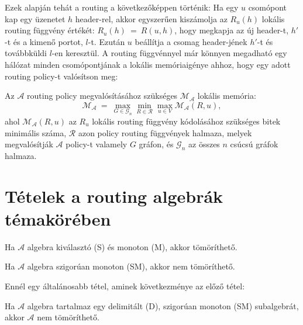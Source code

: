   Ezek alapján tehát a routing a következőképpen történik: Ha egy $u$ csomópont kap egy üzenetet $h$ header-rel, akkor egyszerűen kiszámolja az $R_{u}(h)$ lokális routing függvény értékét: $R_{u}(h)~=~R(u,h)$, hogy megkapja az új header-t, $h'$-t és a kimenő portot, $l$-t. Ezután $u$ beállítja a csomag header-jének $h'$-t és továbbküldi $l$-en keresztül.
  A routing függvénnyel már könnyen megadható egy hálózat minden csomópontjának a lokális memóriaigénye ahhoz, hogy egy adott routing policy-t valósítson meg:
  \begin{definition} 
    Az $\mathcal{A}$ routing policy megvalósításához szükséges $\mathcal{M_{\mathcal{A}}}$ lokális memória: $$\mathcal{M_{\mathcal{A}}}~=~\max_{G \in \mathcal{G}_{n}}{ \min_{R \in \mathcal{R}}{\max_{u \in V}{ \mathcal{M_{\mathcal{A}}}(R,u)}}},$$ ahol $\mathcal{M_{\mathcal{A}}}(R,u)$ az $R_{u}$ lokális routing függvény kódolásához szükséges bitek minimális száma, $\mathcal{R}$ azon policy routing függvények halmaza, melyek megvalósítják $\mathcal{A}$ policy-t valamely $G$ gráfon, és $\mathcal{G}_{n}$ az összes $n$ csúcsú gráfok halmaza.
  \end{definition}

  \section{Tételek a routing algebrák témakörében}\label{sect:appendix_algebratetelek}
  \begin{theorem}\label{eq:appendix_algebratetel1}
    Ha $\mathcal{A}$ algebra kiválasztó (S) és monoton (M), akkor tömöríthető.
  \end{theorem}

  \begin{theorem}\label{eq:appendix_algebratetel2}
    Ha $\mathcal{A}$ algebra szigorúan monoton (SM), akkor nem tömöríthető.
  \end{theorem}

  Ennél egy általánosabb tétel, aminek következménye az előző tétel:
  \begin{theorem}\label{eq:appendix_algebratetel3}
    Ha $\mathcal{A}$ algebra tartalmaz egy delimitált (D), szigorúan monoton (SM) subalgebrát, akkor $\mathcal{A}$ nem tömöríthető.
  \end{theorem}
  \newpage

